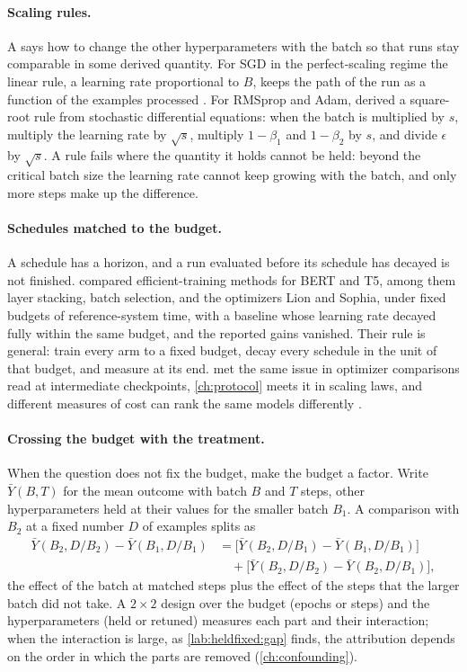 \begin{refsection}
\paragraph{Scaling rules.} A  says how to change the other hyperparameters with the batch so that runs stay comparable in some derived quantity. For SGD in the perfect-scaling regime the linear rule, a learning rate proportional to $B$, keeps the path of the run as a function of the examples processed \parencite{Krizhevsky2014,GoyalEtAl2017}. For RMSprop and Adam, \textcite{MalladiEtAl2022} derived a square-root rule from stochastic differential equations: when the batch is multiplied by $s$, multiply the learning rate by $\sqrt s$, multiply $1-\beta_1$ and $1-\beta_2$ by $s$, and divide $\epsilon$ by $\sqrt s$. A rule fails where the quantity it holds cannot be held: beyond the critical batch size the learning rate cannot keep growing with the batch, and only more steps make up the difference.

\paragraph{Schedules matched to the budget.} A schedule has a horizon, and a run evaluated before its schedule has decayed is not finished. \Textcite{KaddourEtAl2023} compared efficient-training methods for BERT and T5, among them layer stacking, batch selection, and the optimizers Lion and Sophia, under fixed budgets of reference-system time, with a baseline whose learning rate decayed fully within the same budget, and the reported gains vanished. Their rule is general: train every arm to a fixed budget, decay every schedule in the unit of that budget, and measure at its end.  met the same issue in optimizer comparisons read at intermediate checkpoints, \cref{ch:protocol} meets it in scaling laws, and different measures of cost can rank the same models differently \parencite{DehghaniEtAl2022}.

\paragraph{Crossing the budget with the treatment.} When the question does not fix the budget, make the budget a factor. Write $\bar Y(B,T)$ for the mean outcome with batch $B$ and $T$ steps, other hyperparameters held at their values for the smaller batch $B_1$. A comparison with $B_2$ at a fixed number $D$ of examples splits as
\[
\begin{aligned}
\bar Y(B_2,D/B_2)-\bar Y(B_1,D/B_1)&=\bigl[\bar Y(B_2,D/B_1)-\bar Y(B_1,D/B_1)\bigr]\\
&\quad+\bigl[\bar Y(B_2,D/B_2)-\bar Y(B_2,D/B_1)\bigr],
\end{aligned}
\]
the effect of the batch at matched steps plus the effect of the steps that the larger batch did not take. A $2\times2$ design over the budget (epochs or steps) and the hyperparameters (held or retuned) measures each part and their interaction; when the interaction is large, as \cref{lab:heldfixed:gap} finds, the attribution depends on the order in which the parts are removed (\cref{ch:confounding}).


\end{refsection}
